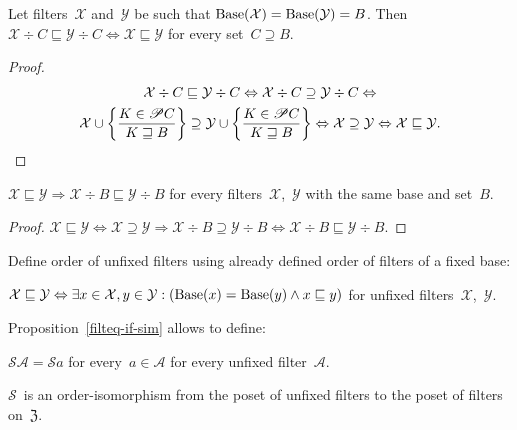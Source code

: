\begin{lem}
Let filters~$\mathcal{X}$
and~$\mathcal{Y}$ be such that
$\operatorname{Base}(\mathcal{X})=\operatorname{Base}(\mathcal{Y})=B$. Then
$\mathcal{X}\div C\sqsubseteq\mathcal{Y}\div C
\Leftrightarrow \mathcal{X}\sqsubseteq\mathcal{Y}$ for every
set~$C\supseteq B$.
\end{lem}

\begin{proof}
\begin{multline*}
\mathcal{X}\div C\sqsubseteq\mathcal{Y}\div C\Leftrightarrow
\mathcal{X}\div C\supseteq\mathcal{Y}\div C\Leftrightarrow\\
\mathcal{X}\cup\left\{ \frac{K\in\mathscr{P} C}{K\sqsupseteq B}\right\} \supseteq \mathcal{Y}\cup\left\{ \frac{K\in\mathscr{P} C}{K\sqsupseteq B}\right\} \Leftrightarrow
\mathcal{X}\supseteq\mathcal{Y} \Leftrightarrow
\mathcal{X}\sqsubseteq\mathcal{Y}.
\end{multline*}
\end{proof}

\begin{prop}
$\mathcal{X}\sqsubseteq\mathcal{Y} \Rightarrow
\mathcal{X}\div B\sqsubseteq\mathcal{Y}\div B$ for every
filters~$\mathcal{X}$,~$\mathcal{Y}$ with the same base
and set~$B$.
\end{prop}

\begin{proof}
$\mathcal{X}\sqsubseteq\mathcal{Y} \Leftrightarrow
\mathcal{X}\supseteq\mathcal{Y} \Rightarrow
\mathcal{X}\div B\supseteq\mathcal{Y}\div B \Leftrightarrow
\mathcal{X}\div B\sqsubseteq\mathcal{Y}\div B$.
\end{proof}

Define order of unfixed filters using already defined order
of filters of a fixed base:

\begin{defn}
$\mathcal{X}\sqsubseteq\mathcal{Y} \Leftrightarrow
\exists x\in\mathcal{X},y\in\mathcal{Y}:
(\operatorname{Base}(x)=\operatorname{Base}(y)\land x\sqsubseteq y)$ for unfixed
filters~$\mathcal{X}$,~$\mathcal{Y}$.
\end{defn}

Proposition~\ref{filteq-if-sim} allows to define:

\begin{defn}
$\mathscr{S}\mathcal{A} = \mathscr{S}a$ for
every~$a\in\mathcal{A}$ for every unfixed
filter~$\mathcal{A}$.
\end{defn}

\begin{thm}\label{mathscrs-iso}
$\mathscr{S}$~is an order-isomorphism from the poset of
unfixed filters to the poset of filters on~$\mathfrak{Z}$.
\end{thm}

